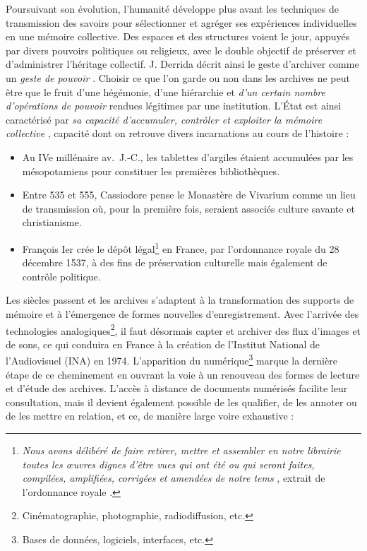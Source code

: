 \documentclass[symmetric,justified,marginals=raggedouter]{tufte-book}
\begin{document}
Poursuivant son évolution, l'humanité développe plus avant les techniques de transmission des savoirs pour sélectionner et agréger ses expériences individuelles en une mémoire collective. Des espaces et des structures voient le jour, appuyés par divers pouvoirs politiques ou religieux, avec le double objectif de préserver et d'administrer l'héritage collectif. J. Derrida décrit ainsi le geste d'archiver comme un \og \textit{geste de pouvoir} \fg{} \citep[p.60]{derrida_trace_2014}. Choisir ce que l'on garde ou non dans les archives ne peut être que le fruit d'une hégémonie, d'une hiérarchie et \og \textit{d'un certain nombre d'opérations de pouvoir} \fg{} rendues légitimes par une institution. L'État est ainsi caractérisé par \og \textit{sa capacité d'accumuler, contrôler et exploiter la mémoire collective} \fg{} \citep{stiegler_etat_1991}, capacité dont on retrouve divers incarnations au cours de l'histoire :

\begin{itemize}[leftmargin=*]  
\item Au IVe millénaire av.~J.-C., les tablettes d'argiles étaient accumulées par les mésopotamiens pour constituer les premières bibliothèques.
\item Entre 535 et 555, Cassiodore pense le Monastère de Vivarium comme un lieu de transmission où, pour la première fois, seraient associés culture savante et christianisme.
\item François Ier crée le dépôt légal\footnote{\RaggedOuter \RaggedOuter\og \textit{Nous avons délibéré de faire retirer, mettre et assembler en notre librairie toutes les œuvres dignes d'être vues qui ont été ou qui seront faites, compilées, amplifiées, corrigées et amendées de notre tems} \fg{}, extrait de l'ordonnance royale \citep{dougnac_depot_1960}.} en France, par l'ordonnance royale du 28 décembre 1537, à des fins de préservation culturelle mais également de contrôle politique.
\end{itemize}

\noindent Les siècles passent et les archives s'adaptent à la transformation des supports de mémoire et à l'émergence de formes nouvelles d'enre\-gistrement. Avec l'arrivée des technologies analogiques\footnote{\RaggedOuter Cinématographie, photographie, radiodiffusion, etc.}, il faut désormais capter et archiver des flux d'images et de sons, ce qui conduira en France à la création de l'Institut National de l'Audiovisuel (INA) en 1974. L'apparition du numérique\footnote{\RaggedOuter Bases de données, logiciels, interfaces, etc.} marque la dernière étape de ce cheminement en ouvrant la voie à un renouveau des formes de lecture et d'étude des archives. L'accès à distance de documents numérisés facilite leur consultation, mais il devient également possible de les qualifier, de les annoter ou de les mettre en relation, et ce, de manière large voire exhaustive \citep{borgman_digital_2000} :
\end{document}
